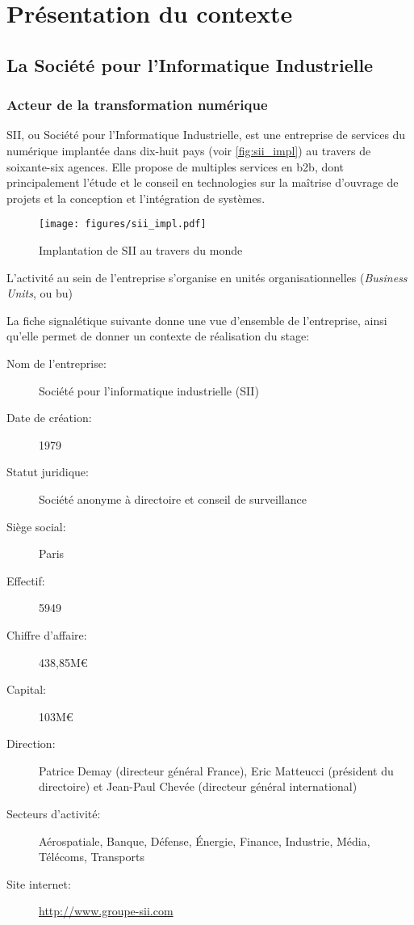 \chapter{Présentation du contexte}
{
	\section{La Société pour l'Informatique Industrielle}
	{
		\subsection{Acteur de la transformation numérique}
		{
			\par
			{
				SII, ou Société pour l'Informatique Industrielle, est une entreprise de services du numérique implantée dans dix-huit pays (voir \autoref{fig:sii_impl}) au travers de soixante-six agences. Elle propose de multiples services en \gls{b2b}, dont principalement l'étude et le conseil en technologies sur la maîtrise d'ouvrage de projets et la conception et l'intégration de systèmes.
			}
			
			\begin{figure}[h]
			{
				\centering
				\texttt{[image: figures/sii\_impl.pdf]}
				\caption{Implantation de SII au travers du monde\cite{sii_rf}}
				\label{fig:sii_impl}
			}
			\end{figure}
			
			\par
			{
				L'activité au sein de l'entreprise s'organise en unités organisationnelles (\emph{Business Units}, ou \gls{bu})
			}
			
			\par
			{
				La fiche signalétique suivante donne une vue d'ensemble de l'entreprise, ainsi qu'elle permet de donner un contexte de réalisation du stage:
			
				\begin{description}
					\item[Nom de l'entreprise:] Société pour l'informatique industrielle (SII)
					\item[Date de création:] 1979\cite{sii_rf}
					\item[Statut juridique:] Société anonyme à directoire et conseil de surveillance
					\item[Siège social:] Paris
					\item[Effectif:] 5949\cite{sii_rs_2017}
					\item[Chiffre d'affaire:] 438,85M\euro\cite{sii_rs_2017}
					\item[Capital:] 103M\euro\cite{sii_rf}
					\item[Direction:] Patrice Demay (directeur général France), Eric Matteucci (président du directoire) et Jean-Paul Chevée (directeur général international)
					\item[Secteurs d'activité:] Aérospatiale, Banque, Défense, Énergie, Finance, Industrie, Média, Télécoms, Transports
					\item[Site internet:] \url{http://www.groupe-sii.com}
				\end{description}
			}
			
}}}
